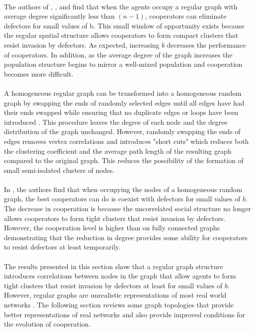 \documentclass{article}
\begin{document}
    \paragraph{}The authors of \cite{Pacheco2005}, \cite{Santos2006a}, \cite{Santos2006c} and \cite{Santos2005b} find that when the agents occupy a regular graph with average degree significantly less than $(n-1)$, cooperators can eliminate defectors for small values of b.  This small window of opportunity exists because the regular spatial structure allows cooperators to form compact clusters that resist invasion by defectors.  As expected, increasing $b$ decreases the performance of cooperators.  In addition, as the average degree of the graph increases the population structure begins to mirror a well-mixed population and cooperation becomes more difficult.
    \paragraph{}A homogeneous regular graph can be transformed into a homogeneous random graph by swapping the ends of randomly selected edges until all edges have had their ends swapped while ensuring that no duplicate edges or loops have been introduced \cite{Maslov2002}.  This procedure leaves the degree of each node and the degree distribution of the graph unchanged. However, randomly swapping the ends of edges removes vertex correlations and introduces "short cuts" which reduces both the clustering coefficient and the average path length of the resulting graph compared to the original graph.  This reduces the possibility of the formation of small semi-isolated clusters of nodes.
    \paragraph{}In \cite{Santos2006c}, the authors find that when occupying the nodes of a homogeneous random graph, the best cooperators can do is coexist with defectors for small values of $b$.  The decrease in cooperation is because the uncorrelated social structure no longer allows cooperators to form tight clusters that resist invasion by defectors.  However, the cooperation level is higher than on fully connected graphs demonstrating that the reduction in degree provides some ability for cooperators to resist defectors at least temporarily.
    \paragraph{} The results presented in this section show that a regular graph structure introduces correlations between nodes in the graph that allow agents to form tight clusters that resist invasion by defectors at least for small values of $b$.  However, regular graphs are unrealistic representations of most real world networks \cite{Pacheco2005}.  The following section reviews some graph topologies that provide better representations of real networks and also provide improved conditions for the evolution of cooperation.
\end{document}
